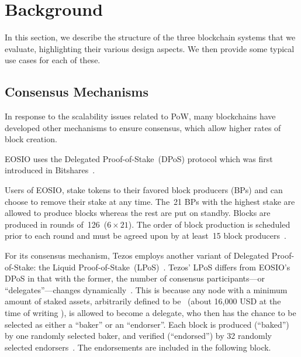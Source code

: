 \section{Background}
\label{sec:background}

In this section, we describe the structure of the three blockchain systems that we evaluate, highlighting their various design aspects. We then provide some typical use cases for each of these.

\subsection{Consensus Mechanisms}

In response to the scalability issues related to PoW, many blockchains have developed other mechanisms to ensure consensus, which allow higher rates of block creation.

\label{sec:DPoS}
EOSIO uses the Delegated Proof-of-Stake~(DPoS) protocol which was first introduced in Bitshares~\cite{bitshares}.

Users of EOSIO, stake  tokens to their favored block producers (BPs) and can choose to remove their stake at any time. 
The~21 BPs with the highest stake are allowed to produce blocks whereas the rest are put on standby. 
Blocks are produced in rounds of~126~($6 \times 21$). 
The order of block production is scheduled prior to each round and must be agreed upon by at least~15 block producers~\cite{EOS}.


For its consensus mechanism, Tezos employs another variant of Delegated Proof-of-Stake: the Liquid Proof-of-Stake~(LPoS)~\cite{Tezos2018}.
Tezos' LPoS differs from EOSIO's DPoS in that with the former, the number of consensus participants---or ``delegates''---changes dynamically~\cite{Tezos2018, Goodman2014}.
This is because any node with a minimum amount of staked assets, arbitrarily defined to be~  (about 16,000 USD at the time of writing \cite{CoinMarketCap2020}), is allowed to become a delegate, who then has the chance to be selected as either a ``baker'' or an ``endorser''.
Each block is produced (``baked'') by one randomly selected baker, and verified (``endorsed'') by 32 randomly selected endorsers~\cite{Tezos2018}. 
The endorsements are included in the following block.

